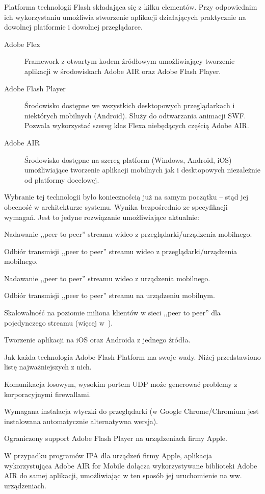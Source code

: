 Platforma technologii Flash składająca się z kilku elementów. Przy odpowiednim ich wykorzystaniu umożliwia stworzenie aplikacji działających praktycznie na dowolnej platformie i dowolnej przeglądarce.

\begin{description}
    \item[Adobe Flex] Framework z otwartym kodem źródłowym umożliwiający tworzenie aplikacji w środowiskach Adobe AIR oraz Adobe Flash Player.
    \item[Adobe Flash Player] Środowisko dostępne we wszystkich desktopowych przeglądarkach i niektórych mobilnych (Android). Służy do odtwarzania animacji SWF. Pozwala wykorzystać szereg klas Flexa niebędących częścią Adobe AIR.
    \item[Adobe AIR] Środowisko dostępne na szereg platform (Windows, Android, iOS) umożliwiające tworzenie aplikacji mobilnych jak i desktopowych niezależnie od platformy docelowej.
\end{description}

Wybranie tej technologii było koniecznością już na samym początku -- stąd jej obecność w architekturze systemu. Wynika bezpośrednio ze specyfikacji wymagań. Jest to jedyne rozwiązanie umożliwiające aktualnie:
\begin{packed_item}
    \item{Nadawanie ,,peer to peer'' streamu wideo z przeglądarki/urządzenia mobilnego.}
    \item{Odbiór transmisji ,,peer to peer'' streamu wideo z przeglądarki/urządzenia mobilnego.}
    \item{Nadawanie ,,peer to peer'' streamu wideo z urządzenia mobilnego.}
    \item{Odbiór transmisji ,,peer to peer'' streamu na urządzeniu mobilnym.}
    \item{Skalowalność na poziomie miliona klientów w sieci ,,peer to peer'' dla pojedynczego streamu (więcej w~\cite{MattKauf2009}).}
    \item{Tworzenie aplikacji na iOS oraz Androida z jednego źródła.}
\end{packed_item}

Jak każda technologia Adobe Flash Platform ma swoje wady. Niżej przedstawiono listę najważniejszych z nich.
\begin{packed_item}
    \item{Komunikacja losowym, wysokim portem UDP może generować problemy z korporacyjnymi firewallami.}
    \item{Wymagana instalacja wtyczki do przeglądarki (w Google Chrome/Chromium jest instalowana automatycznie alternatywna wersja).}
    \item{Ograniczony support Adobe Flash Player na urządzeniach firmy Apple.}
    \item{W przypadku programów IPA dla urządzeń firmy Apple, aplikacja wykorzystująca Adobe AIR for Mobile dołącza wykorzystywane biblioteki Adobe AIR do samej aplikacji, umożliwiając w ten sposób jej uruchomienie na ww. urządzeniach.}
\end{packed_item}


